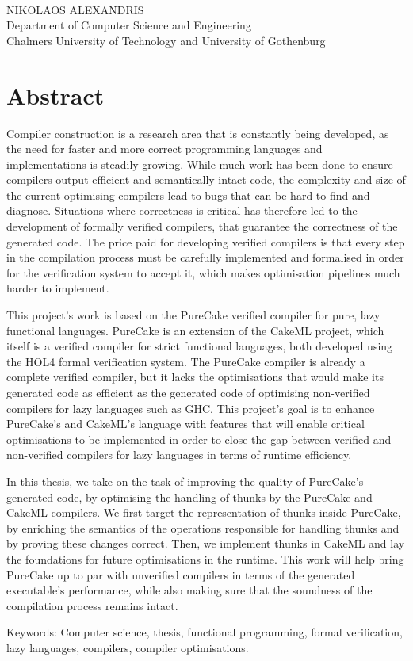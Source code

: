 \oneLineTitle\\
NIKOLAOS ALEXANDRIS\\
Department of Computer Science and Engineering\\
Chalmers University of Technology and University of Gothenburg

\thispagestyle{plain}			%
\section*{Abstract}

Compiler construction is a research area that is constantly being developed, as
the need for faster and more correct programming languages and implementations
is steadily growing. While much work has been done to ensure compilers output
efficient and semantically intact code, the complexity and size of the current
optimising compilers lead to bugs that can be hard to find and diagnose.
Situations where correctness is critical has therefore led to the development of
formally verified compilers, that guarantee the correctness of the generated
code. The price paid for developing verified compilers is that every step in the
compilation process must be carefully implemented and formalised in order for
the verification system to accept it, which makes optimisation pipelines much
harder to implement.

This project's work is based on the PureCake verified compiler for pure, lazy
functional languages. PureCake is an extension of the CakeML project, which
itself is a verified compiler for strict functional languages, both developed
using the HOL4 formal verification system. The PureCake compiler is already a
complete verified compiler, but it lacks the optimisations that would make its
generated code as efficient as the generated code of optimising non-verified
compilers for lazy languages such as GHC. This project's goal is to enhance
PureCake's and CakeML's language with features that will enable critical
optimisations to be implemented in order to close the gap between verified and
non-verified compilers for lazy languages in terms of runtime efficiency.

In this thesis, we take on the task of improving the quality of PureCake's
generated code, by optimising the handling of thunks by the PureCake and CakeML
compilers. We first target the representation of thunks inside PureCake, by
enriching the semantics of the operations responsible for handling thunks and by
proving these changes correct. Then, we implement thunks in CakeML and lay the
foundations for future optimisations in the runtime. This work will help bring
PureCake up to par with unverified compilers in terms of the generated
executable's performance, while also making sure that the soundness of the
compilation process remains intact.

\vfill
Keywords: Computer science, thesis, functional programming, formal verification,
lazy languages, compilers, compiler optimisations.

\newpage				%
\thispagestyle{empty}
\mbox{}
